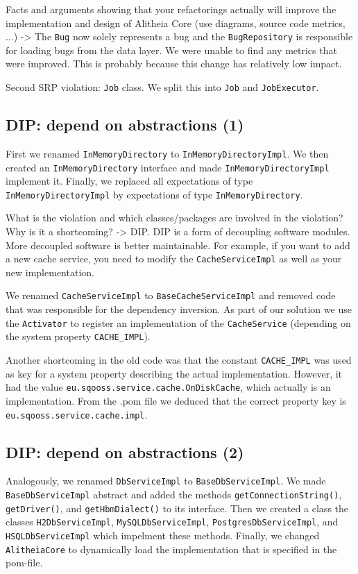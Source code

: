 \documentclass{article}
\begin{document}
Facts and arguments showing that your refactorings actually will improve the implementation and design of Alitheia Core (use diagrams, source code metrics, ...)
 -> The \verb|Bug| now solely represents a bug and the \verb|BugRepository| is responsible for loading bugs from the data layer. We were unable to find any metrics that were improved. This is probably because this change has relatively low impact.

Second SRP violation: \verb|Job| class. We split this into \verb|Job| and \verb|JobExecutor|.

\subsection{DIP: depend on abstractions (1)}
First we renamed \verb|InMemoryDirectory| to \verb|InMemoryDirectoryImpl|. We then created an \texttt{InMemoryDirectory} interface and made \verb|InMemoryDirectoryImpl| implement it. Finally, we replaced all expectations of type \verb|InMemoryDirectoryImpl| by expectations of type \verb|InMemoryDirectory|.

What is the violation and which classes/packages are involved in the violation? Why is it a shortcoming?
 -> DIP. DIP is a form of decoupling software modules. More decoupled software is better maintainable. For example, if you want to add a new cache service, you need to modify the \verb|CacheServiceImpl| as well as your new implementation.

We renamed \verb|CacheServiceImpl| to \verb|BaseCacheServiceImpl| and removed code that was responsible for the dependency inversion. As part of our solution we use the \verb|Activator| to register an implementation of the \verb|CacheService| (depending on the system property \verb|CACHE_IMPL|).

Another shortcoming in the old code was that the constant \verb|CACHE_IMPL| was used as key for a system property describing the actual implementation. However, it had the value \texttt{eu\allowbreak.sqooss.service.cache.OnDiskCache}, which actually is an implementation. From the .pom file we deduced that the correct property key is \verb|eu.sqooss.service.cache.impl|.

\subsection{DIP: depend on abstractions (2)}
Analogously, we renamed \verb|DbServiceImpl| to \verb|BaseDbServiceImpl|. We made \verb|BaseDbServiceImpl| abstract and added the methods \verb|getConnectionString()|, \verb|getDriver()|, and \verb|getHbmDialect()| to its interface. Then we created a class the classes \verb|H2DbServiceImpl|, \verb|MySQLDbServiceImpl|, \verb|PostgresDbServiceImpl|, and \verb|HSQLDbServiceImpl| which impelment these methods. Finally, we changed \verb|AlitheiaCore| to dynamically load the implementation that is specified in the pom-file.
\end{document}
